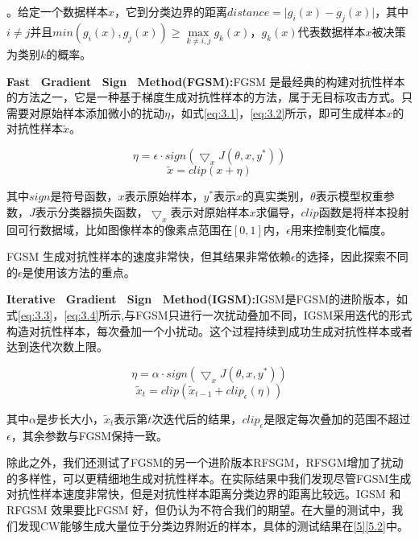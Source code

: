 \begin{myDef}
	\label{def:3}
	。给定一个数据样本$x$，它到分类边界的距离$distance = \vert g_i(x) - g_j(x) \vert$，其中$i \neq j $并且$min(g_i(x), g_j(x)) \geq \mathop{max} \limits_{k \neq i, j}g_k(x)$，$g_k(x)$代表数据样本$x$被决策为类别$k$的概率。
\end{myDef}

\noindent\textbf{Fast \ Gradient \ Sign \ Method(FGSM):}FGSM \cite{goodfellow2014explaining}是最经典的构建对抗性样本的方法之一，它是一种基于梯度生成对抗性样本的方法，属于无目标攻击方式。只需要对原始样本添加微小的扰动$\eta$，如式\ref{eq:3.1}，\ref{eq:3.2}所示，即可生成样本$x$的对抗性样本$\tilde{x}$。

\begin{equation}
	\label{eq:3.1}
	\eta = \epsilon \cdot sign(\bigtriangledown_xJ(\theta,x,y^*))
\end{equation}
\begin{equation}
	\label{eq:3.2}
	\tilde{x} = clip(x + \eta)
\end{equation}

\noindent 其中$sign$是符号函数，$x$表示原始样本，$y^*$表示$x$的真实类别，$\theta$表示模型权重参数，$J$表示分类器损失函数，$\bigtriangledown_x$表示对原始样本$x$求偏导，$clip$函数是将样本投射回可行数据域，比如图像样本的像素点范围在$[0,1]$内，$\epsilon$用来控制变化幅度。

FGSM 生成对抗性样本的速度非常快，但其结果非常依赖$\epsilon$的选择，因此探索不同的$\epsilon$是使用该方法的重点。

\noindent\textbf{Iterative \ Gradient \ Sign \ Method(IGSM):}IGSM\cite{kurakin2018adversarial}是FGSM的进阶版本，如式\ref{eq:3.3}，\ref{eq:3.4}所示,与FGSM只进行一次扰动叠加不同，IGSM采用迭代的形式构造对抗性样本，每次叠加一个小扰动。这个过程持续到成功生成对抗性样本或者达到迭代次数上限。

\begin{equation}
	\label{eq:3.3}
	\eta = \alpha \cdot sign(\bigtriangledown_xJ(\theta,x,y^*))
\end{equation}
\begin{equation}
	\label{eq:3.4}
	\tilde{x}_t = clip(\tilde{x}_{t - 1}  + clip_{\epsilon}(\eta))
\end{equation}

\noindent 其中$\alpha$是步长大小，$\tilde{x}_t$表示第$t$次迭代后的结果，$clip_{\epsilon}$是限定每次叠加的范围不超过$\epsilon$，其余参数与FGSM保持一致。

除此之外，我们还测试了FGSM的另一个进阶版本RFSGM\cite{tramer2017ensemble}，RFSGM增加了扰动的多样性，可以更精细地生成对抗性样本。在实际结果中我们发现尽管FGSM生成对抗性样本速度非常快，但是对抗性样本距离分类边界的距离比较远。IGSM 和RFGSM 效果要比FGSM 好，但仍认为不符合我们的期望。在大量的测试中，我们发现CW能够生成大量位于分类边界附近的样本，具体的测试结果在\ref{5}\ref{5.2}中。

